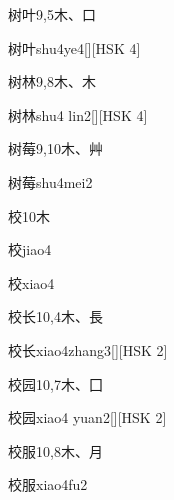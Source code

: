 \begin{Entry}{树叶}{9,5}{⽊、⼝}
  \begin{Phonetics}{树叶}{shu4ye4}[][HSK 4]
  \end{Phonetics}
\end{Entry}

\begin{Entry}{树林}{9,8}{⽊、⽊}
  \begin{Phonetics}{树林}{shu4 lin2}[][HSK 4]
  \end{Phonetics}
\end{Entry}

\begin{Entry}{树莓}{9,10}{⽊、⾋}
  \begin{Phonetics}{树莓}{shu4mei2}
  \end{Phonetics}
\end{Entry}

\begin{Entry}{校}{10}{⽊}
  \begin{Phonetics}{校}{jiao4}
  \end{Phonetics}
  \begin{Phonetics}{校}{xiao4}
  \end{Phonetics}
\end{Entry}

\begin{Entry}{校长}{10,4}{⽊、⾧}
  \begin{Phonetics}{校长}{xiao4zhang3}[][HSK 2]
  \end{Phonetics}
\end{Entry}

\begin{Entry}{校园}{10,7}{⽊、⼞}
  \begin{Phonetics}{校园}{xiao4 yuan2}[][HSK 2]
  \end{Phonetics}
\end{Entry}

\begin{Entry}{校服}{10,8}{⽊、⽉}
  \begin{Phonetics}{校服}{xiao4fu2}
  \end{Phonetics}
\end{Entry}

